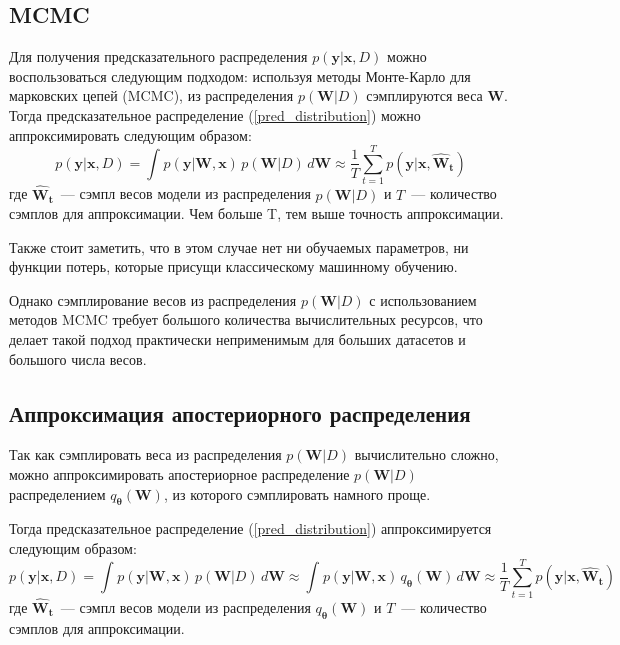 \documentclass{article}
\numberwithin{equation}{section}
\begin{document}
    \subsection{MCMC}

    Для получения предсказательного распределения $p(\pmb{y} | \pmb{x}, D)$
    можно воспользоваться следующим подходом:
    используя методы Монте-Карло для марковских цепей (MCMC),
    из распределения $p(\pmb{W}| D)$ сэмплируются веса $\pmb{W}$.
    Тогда предсказательное распределение (\ref{pred_distribution})
    можно аппроксимировать следующим образом:
    \begin{equation}
        p(\pmb{y} | \pmb{x}, D)
        =
        \int_{}{
            p(\pmb{y} | \pmb{W}, \pmb{x})
            \,
            p(\pmb{W} | D)
            \,
            d\pmb{W}
        }
        \approx
            \frac{1}{T}
            \sum_{t=1}^{T}{
                p (
                    \pmb{y} | \pmb{x},
                    \pmb{\hat{W}_{t}}
                )
            }
    \end{equation}
    где $\pmb{\hat{W}_{t}}$~--- сэмпл весов модели из распределения $p(\pmb{W}| D)$
    и $T$~--- количество сэмплов для аппроксимации.
    Чем больше T, тем выше точность аппроксимации.

    Также стоит заметить, что в этом случае нет ни обучаемых параметров, ни функции потерь,
    которые присущи классическому машинному обучению.

    Однако сэмплирование весов из распределения $p(\pmb{W}| D)$ с использованием методов MCMC
    требует большого количества вычислительных ресурсов,
    что делает такой подход практически неприменимым для больших датасетов и большого числа весов.

    \subsection{Аппроксимация апостериорного распределения}

    Так как сэмплировать веса из распределения $p(\pmb{W}| D)$ вычислительно сложно,
    можно аппроксимировать апостериорное распределение $p(\pmb{W}| D)$
    распределением $q_{\pmb{\theta}}(\pmb{W})$, из которого сэмплировать намного проще.

    Тогда предсказательное распределение (\ref{pred_distribution})
    аппроксимируется следующим образом:
    \begin{equation}
        p(\pmb{y} | \pmb{x}, D)
        =
        \int_{}{
            p(\pmb{y} | \pmb{W}, \pmb{x})
            \,
            p(\pmb{W} | D)
            \,
            d\pmb{W}
        }
        \approx
        \int_{}{
            p(\pmb{y} | \pmb{W}, \pmb{x})
            \,
            q_{\pmb{\theta}}(\pmb{W})
            \,
            d\pmb{W}
        }
        \approx
            \frac{1}{T}
            \sum_{t=1}^{T}{
                p (
                    \pmb{y} | \pmb{x},
                    \pmb{\hat{W}_{t}}
                )
            }
    \end{equation}
    где $\pmb{\hat{W}_{t}}$~--- сэмпл весов модели из распределения $q_{\pmb{\theta}}(\pmb{W})$
    и $T$~--- количество сэмплов для аппроксимации.
\end{document}
